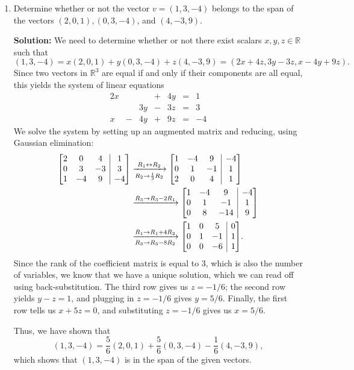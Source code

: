 \documentclass[12pt]{article}
\makeatletter
\newcommand{\points}[1]{\marginpar{\hspace{24pt}[#1]}}
\newenvironment{amatrix}[1]{%
  \left[\begin{array}{@{}*{#1}{c}|c@{}}
}{%
  \end{array}\right]
}
\newcommand{\R}{\mathbb{R}}
\makeatother
\begin{document}
\begin{enumerate}
\item Determine whether or not the vector $v=(1,3,-4)$ belongs to the span of the vectors $(2,0,1), (0,3,-4)$, and  $(4,-3,9)$. \points{8}

\bigskip

{\bf Solution:} We need to determine whether or not there exist scalars $x,y,z\in\R$ such that
\[
 (1,3,-4) = x(2,0,1)+y(0,3,-4)+z(4,-3,9) = (2x+4z,3y-3z,x-4y+9z).
\]
Since two vectors in $\R^3$ are equal if and only if their components are all equal, this yields the system of linear equations
\[
 \begin{array}{ccccccc}
  2x& &  &+&4y&=&1\\
    & &3y&-&3z&=&3\\
   x&-&4y&+&9z&=&-4
 \end{array}
\]
We solve the system by setting up an augmented matrix and reducing, using Gaussian elimination:
\begin{align*}
 \begin{amatrix}{3}
  2&0&4&1\\
  0&3&-3&3\\
  1&-4&9&-4
 \end{amatrix}&\xrightarrow[R_2\to \frac{1}{3}R_2]{R_1\leftrightarrow R_2}
 \begin{amatrix}{3}
  1&-4&9&-4\\
  0& 1&-1&1\\
  2&0&4&1
 \end{amatrix}\\
&\xrightarrow[]{R_3\to R_3-2R_1}
\begin{amatrix}{3}
 1&-4&9&-4\\0&1&-1&1\\0&8&-14&9
\end{amatrix}\\
&\xrightarrow[R_3\to R_3-8R_2]{R_1\to R_1+4R_2}
 \begin{amatrix}{3}
  1&0&5&0\\0&1&-1&1\\0&0&-6&1
 \end{amatrix}.
\end{align*}
Since the rank of the coefficient matrix is equal to 3, which is also the number of variables, we know that we have a unique solution, which we can read off using back-substitution. The third row gives us $z=-1/6$; the second row yields $y-z=1$, and plugging in $z=-1/6$ gives $y=5/6$. Finally, the first row tells us $x+5z=0$, and substituting $z=-1/6$ gives us $x=5/6$.

Thus, we have shown that
\[
 (1,3,-4) = \frac{5}{6}(2,0,1)+\frac{5}{6}(0,3,-4)-\frac{1}{6}(4,-3,9),
\]
which shows that $(1,3,-4)$ is in the span of the given vectors.



\end{enumerate}
\end{document}
